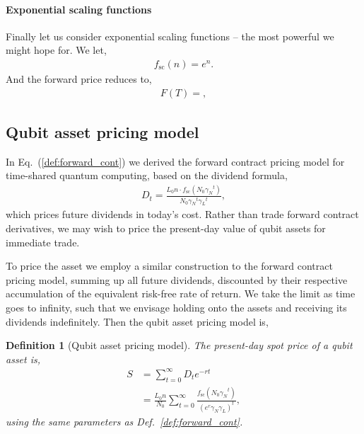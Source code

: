 \documentclass[aps, rmp, twocolumn, amsmath, amssymb, nofootinbib, superscriptaddress, longbibliography, floatfix, table-of-contents, eqsecnum]{revtex4-1}
\newcommand{\comment}[1]{{\color{blue}{\textbf{#1}}}}
\newtheorem{definition}{Definition}
\begin{document}
%
%

\paragraph{Exponential scaling functions}

Finally let us consider exponential scaling functions -- the most powerful we might hope for. We let,
\begin{align}
f_\text{sc}(n) = e^n.	
\end{align}
And the forward price reduces to,
\begin{align}
F(T) = ,
\end{align}
\comment{To do}

%
%

\subsection{Qubit asset pricing model}

In Eq.~(\ref{def:forward_cont}) we derived the forward contract pricing model for time-shared quantum computing, based on the dividend formula,
\begin{align}
D_t = \frac{L_0 n\cdot f_\text{sc}(N_0 {\gamma_N}^{t})}{N_0 {\gamma_N}^{t}{\gamma_L}^{t}},
\end{align}
which prices future dividends in today's cost. Rather than trade forward contract derivatives, we may wish to price the present-day value of qubit assets for immediate trade.

To price the asset we employ a similar construction to the forward contract pricing model, summing up all future dividends, discounted by their respective accumulation of the equivalent risk-free rate of return. We take the limit as time goes to infinity, such that we envisage holding onto the assets and receiving its dividends indefinitely. Then the qubit asset pricing model is,

\begin{definition}[Qubit asset pricing model] \label{def:qubit_ass_pricing}
The present-day spot price of a qubit asset is,	
\begin{align}
S &= \sum_{t=0}^\infty D_t e^{-rt} \nonumber \\
&= \frac{L_0 n}{N_0} \sum_{t=0}^\infty \frac{f_\text{sc}({N_0\gamma_N}^{t})}{{(e^r \gamma_N \gamma_L)}^{t}},
\end{align}	
using the same parameters as Def.~\ref{def:forward_cont}.
\end{definition}
\end{document}
